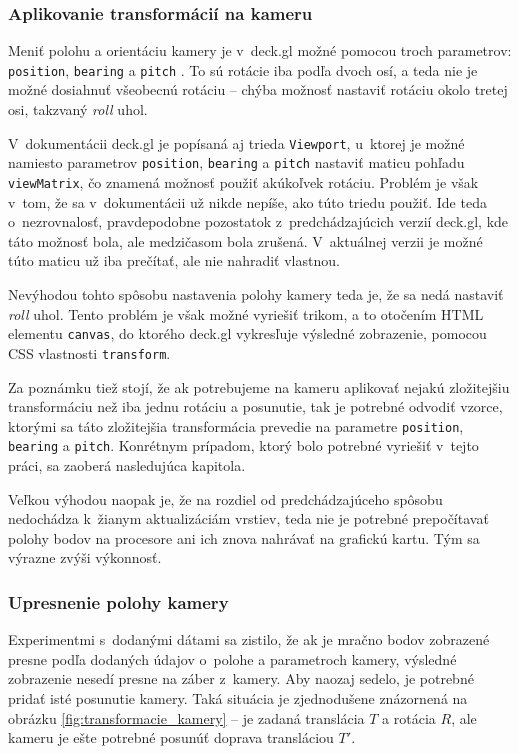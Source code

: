 \subsubsection{Aplikovanie transformácií na kameru}

Meniť polohu a orientáciu kamery je v~deck.gl možné pomocou troch parametrov: \texttt{position}, \texttt{bearing} a \texttt{pitch} \cite{deck.gl_documentation}. To sú rotácie iba podľa dvoch osí, a teda nie je možné dosiahnuť všeobecnú rotáciu -- chýba možnosť nastaviť rotáciu okolo tretej osi, takzvaný \emph{roll} uhol.

V~dokumentácii deck.gl je popísaná aj trieda \texttt{Viewport}, u~ktorej je možné namiesto parametrov \texttt{position}, \texttt{bearing} a \texttt{pitch} nastaviť maticu pohľadu \texttt{viewMatrix}, čo znamená možnosť použiť akúkoľvek rotáciu. Problém je však v~tom, že sa v~dokumentácii už nikde nepíše, ako túto triedu použiť. Ide teda o~nezrovnalosť, pravdepodobne pozostatok z~predchádzajúcich verzií deck.gl, kde táto možnosť bola, ale medzičasom bola zrušená. V~aktuálnej verzii je možné túto maticu už iba prečítať, ale nie nahradiť vlastnou.

Nevýhodou tohto spôsobu nastavenia polohy kamery teda je, že sa nedá nastaviť \emph{roll} uhol. Tento problém je však možné vyriešiť trikom, a to otočením HTML elementu \texttt{canvas}, do ktorého deck.gl vykresľuje výsledné zobrazenie, pomocou CSS vlastnosti \texttt{transform}. 

Za poznámku tiež stojí, že ak potrebujeme na kameru aplikovať nejakú zložitejšiu transformáciu než iba jednu rotáciu a posunutie, tak je potrebné odvodiť vzorce, ktorými sa táto zložitejšia transformácia prevedie na parametre \texttt{position}, \texttt{bearing} a \texttt{pitch}. Konrétnym prípadom, ktorý bolo potrebné vyriešiť v~tejto práci, sa zaoberá nasledujúca kapitola.

Veľkou výhodou naopak je, že na rozdiel od predchádzajúceho spôsobu nedochádza k~žianym aktualizáciám vrstiev, teda nie je potrebné prepočítavať polohy bodov na procesore ani ich znova nahrávať na grafickú kartu. Tým sa výrazne zvýši výkonnosť.

\subsubsection{Upresnenie polohy kamery}

Experimentmi s~dodanými dátami sa zistilo, že ak je mračno bodov zobrazené presne podľa dodaných údajov o~polohe a parametroch kamery, výsledné zobrazenie nesedí presne na záber z~kamery. Aby naozaj sedelo, je potrebné pridať isté posunutie kamery. Taká situácia je zjednodušene znázornená na obrázku \ref{fig:transformacie_kamery} -- je zadaná translácia $T$ a rotácia $R$, ale kameru je ešte potrebné posunúť doprava transláciou $T'$.

